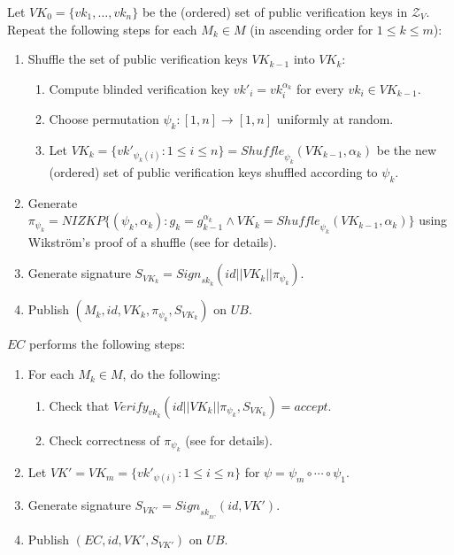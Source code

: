 \documentclass[bibtotoc,halfparskip,oneside]{scrreprt}
\newcommand{\eid}{\mathit{id}\xspace}
\newcommand{\sk}[1]{\mathit{sk}_{#1}\xspace}
\newcommand{\vk}[1]{\mathit{vk}_{#1}\xspace}
\newcommand{\vkprime}[1]{\mathit{vk}'_{#1}\xspace}
\newcommand{\SK}[1]{\sk{_#1}\xspace}
\newcommand{\EC}{\ensuremath{\mathit{EC}}\xspace}
\newcommand{\UB}{\ensuremath{\mathit{UB}}\xspace}
\newcommand{\Mixer}[1]{\ensuremath{\mathit{M}_{#1}}\xspace}
\begin{document}
Let $\mathit{VK}_0=\{\vk{1},\ldots,\vk{n}\}$ be the (ordered) set of public verification keys in $\mathcal{Z}_V$. Repeat the following steps for each $\Mixer{k}\in M$ (in ascending order for $1\leq k\leq m$):
\begin{enumerate}
	\item Shuffle the set of public verification keys $\mathit{VK}_{k-1}$ into $\mathit{VK}_{k}$:
	\begin{enumerate}
		\item Compute blinded verification key $\vkprime{i}=\vk{i}^{\alpha_k}$ for every $\vk{i}\in\mathit{VK}_{k-1}$.
		\item Choose permutation $\psi_k:[1,n]\rightarrow[1,n]$ uniformly at random.
		\item Let $\mathit{VK}_k=\{\vkprime{\psi_k(i)}: 1\leq i\leq n\}=\mathit{Shuffle}_{\psi_k}(\mathit{VK}_{k-1},\alpha_k)$ be the new (ordered) set of public verification keys shuffled according to $\psi_k$.
	\end{enumerate}
	\item Generate $\pi_{\psi_k}=\mathit{NIZKP}\{(\psi_k,\alpha_k):g_k=g_{k-1}^{\alpha_k}\wedge \mathit{VK}_{k}=\mathit{Shuffle}_{\psi_k}(\mathit{VK}_{k-1},\alpha_k)\}$ using Wikström's proof of a shuffle (see  for details).
	\item Generate signature $S_{\mathit{VK}_k}=\mathit{Sign}_{\sk{k}}(\eid||\mathit{VK}_k||\pi_{\psi_k})$.
	\item Publish $(\Mixer{k},\eid,\mathit{VK}_k,\pi_{\psi_k},S_{\mathit{VK}_k})$ on \UB.
\end{enumerate}

\EC performs the following steps:
\begin{enumerate}[resume]
	\item For each $\Mixer{k}\in M$, do the following:
	\begin{enumerate}
		\item Check that $\mathit{Verify}_{\vk{k}}(\eid||\mathit{VK}_k||\pi_{\psi_k},S_{\mathit{VK}_k})=\mathit{accept}$.
		\item Check correctness of $\pi_{\psi_k}$ (see  for details).
	\end{enumerate}
	\item Let $\mathit{VK}'=\mathit{VK}_m=\{\vkprime{\psi(i)}:1\leq i\leq n\}$ for $\psi=\psi_m\circ\cdots\circ\psi_1$.
	\item Generate signature $S_{\mathit{VK}'}=\mathit{Sign}_{\SK{\EC}}(\eid,\mathit{VK}')$.
	\item Publish $(\EC,\eid,\mathit{VK}',S_{\mathit{VK}'})$ on \UB.
\end{enumerate}
\end{document}
